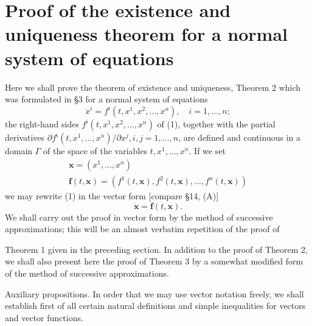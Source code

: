 \documentclass[10pt,a5paper]{book}
\theoremstyle{plain}
\theoremstyle{definition}
\theoremstyle{remark}
\begin{document}
\section{Proof of the existence and uniqueness theorem for a normal system of equations}
Here we shall prove the theorem of existence and uniqueness, Theorem 2 which was formulated in §3 for a normal system of equations
\begin{equation*}
\dot{x}^{i}=f^{i}\left(t, x^{1}, x^{2}, \ldots, x^{n}\right), \quad i=1, \ldots, n ; \tag{1}
\end{equation*}
the right-hand sides $f^{i}\left(t, x^{1}, x^{2}, \ldots, x^{n}\right)$ of (1), together with the partial derivatives $\partial f^{i}\left(t, x^{1}, \ldots, x^{n}\right) / \partial x^{j}, i, j=1, \ldots, n$, are defined and continuous in a domain $\Gamma$ of the space of the variables $t, x^{1}, \ldots, x^{n}$. If we set
\begin{gather*}
\mathbf{x}=\left(x^{1}, \ldots, x^{n}\right)  \tag{2}\\
\mathbf{f}(t, \mathbf{x})=\left(f^{1}(t, \mathbf{x}), f^{2}(t, \mathbf{x}), \ldots, f^{n}(t, \mathbf{x})\right)
\end{gather*}
we may rewrite (1) in the vector form [compare §14, (A)]
\begin{equation*}
\dot{\mathbf{x}}=\mathbf{f}(t, \mathbf{x}) . \tag{3}
\end{equation*}
We shall carry out the proof in vector form by the method of successive approximations; this will be an almost verbatim repetition of the proof of

Theorem 1 given in the preceding section. In addition to the proof of Theorem 2, we shall also present here the proof of Theorem 3 by a somewhat modified form of the method of successive approximations.

Auxiliary propositions. In order that we may use vector notation freely, we shall establish first of all certain natural definitions and simple inequalities for vectors and vector functions.
\end{document}
